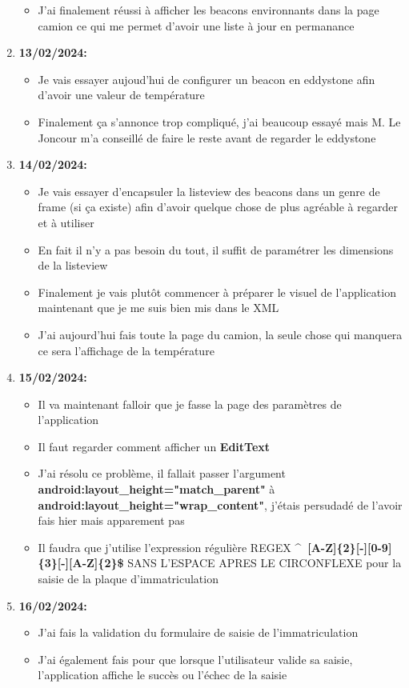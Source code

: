 \documentclass[10pt,a4paper]{book}
\begin{document}
\begin{enumerate}
\begin{itemize}
            \item J'ai finalement réussi à afficher les beacons environnants dans la page camion ce qui me permet d'avoir une liste à jour en permanance
        \end{itemize}
    \item \textbf{13/02/2024:}
        \begin{itemize}
            \item Je vais essayer aujoud'hui de configurer un beacon en eddystone afin d'avoir une valeur de température
            \item Finalement ça s'annonce trop compliqué, j'ai beaucoup essayé mais M. Le Joncour m'a conseillé de faire le reste avant de regarder le eddystone
        \end{itemize}
    \item \textbf{14/02/2024:}
        \begin{itemize}
            \item Je vais essayer d'encapsuler la listeview des beacons dans un genre de frame (si ça existe) afin d'avoir quelque chose de plus agréable à regarder et à utiliser
            \item En fait il n'y a pas besoin du tout, il suffit de paramétrer les dimensions de la listeview
            \item Finalement je vais plutôt commencer à préparer le visuel de l'application maintenant que je me suis bien mis dans le XML
            \item J'ai aujourd'hui fais toute la page du camion, la seule chose qui manquera ce sera l'affichage de la température
        \end{itemize}
    \item \textbf{15/02/2024:}
        \begin{itemize}
            \item Il va maintenant falloir que je fasse la page des paramètres de l'application
            \item Il faut regarder comment afficher un \textbf{EditText}
            \item J'ai résolu ce problème, il fallait passer l'argument \textbf{android:layout\_height="match\_parent"} à \textbf{android:layout\_height="wrap\_content"}, j'étais persudadé de l'avoir fais hier mais apparement pas
            \item Il faudra que j'utilise l'expression régulière REGEX \textbf{\^~[A-Z]\{2\}[-][0-9]\{3\}[-][A-Z]\{2\}\$} SANS L'ESPACE APRES LE CIRCONFLEXE pour la saisie de la plaque d'immatriculation
        \end{itemize}
    \item \textbf{16/02/2024:}
        \begin{itemize}
            \item J'ai fais la validation du formulaire de saisie de l'immatriculation
            \item J'ai également fais pour que lorsque l'utilisateur valide sa saisie, l'application affiche le succès ou l'échec de la saisie
        \end{itemize}
\end{enumerate}
\end{document}

